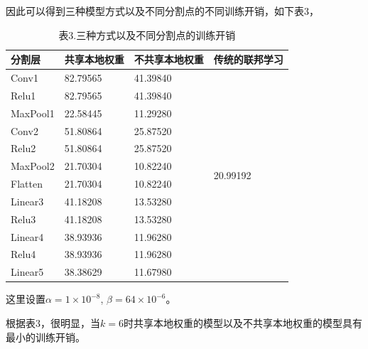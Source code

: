 \documentclass{article}
\begin{document}
因此可以得到三种模型方式以及不同分割点的不同训练开销，如下表3，

\begin{table}[H]
    \caption*{表3.三种方式以及不同分割点的训练开销}
    \centering
    \begin{threeparttable}
    \begin{tabular}{llll}
    \toprule
    分割层 & 共享本地权重 & 不共享本地权重 & 传统的联邦学习\\
    \midrule
    Conv1 & 82.79565 & 41.39840 & \multirow{12}{*}{20.99192}  \\
    Relu1 & 82.79565 & 41.39840 \\
    MaxPool1 & 22.58445 & 11.29280 \\
    Conv2 & 51.80864 & 25.87520\\
    Relu2 & 51.80864 & 25.87520 \\
    MaxPool2 & 21.70304 & 10.82240 \\
    Flatten & 21.70304 & 10.82240 \\
    Linear3 & 41.18208 & 13.53280 \\
    Relu3 & 41.18208 & 13.53280 \\
    Linear4 & 38.93936 & 11.96280\\
    Relu4 & 38.93936 & 11.96280 \\
    Linear5 & 38.38629 & 11.67980\\
    \bottomrule
    \end{tabular}
    \begin{tablenotes}[c]
        \footnotesize
        \item 这里设置$\alpha = 1\times 10^{-8} $, $\beta = 64 \times 10^{-6} $。
    \end{tablenotes}
    \end{threeparttable}
    \end{table}

根据表3，很明显，当$k=6$时共享本地权重的模型以及不共享本地权重的模型具有最小的训练开销。
\end{document}
